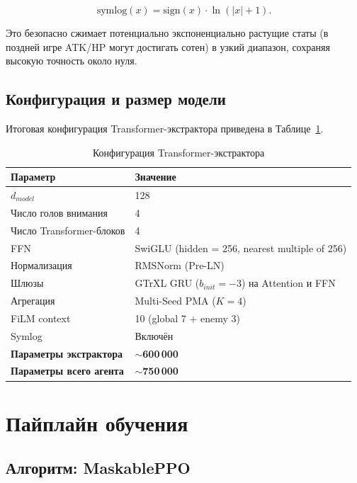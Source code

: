 \documentclass[a4paper,12pt]{extarticle}
\begin{document}
\begin{equation}
\text{symlog}(x) = \text{sign}(x) \cdot \ln(|x| + 1)\text{.}
\end{equation}

Это безопасно сжимает потенциально экспоненциально растущие статы (в поздней игре ATK/HP могут достигать сотен) в узкий диапазон, сохраняя высокую точность около нуля.

\subsection{Конфигурация и размер модели}

Итоговая конфигурация Transformer-экстрактора приведена в Таблице~\ref{tab:transformer_config}.

\begin{longtable}{p{5.5cm}p{8cm}}
\caption{Конфигурация Transformer-экстрактора}\label{tab:transformer_config}\\
\toprule
\textbf{Параметр} & \textbf{Значение} \\
\midrule
$d_{model}$ & 128 \\
Число голов внимания & 4 \\
Число Transformer-блоков & 4 \\
FFN & SwiGLU (hidden = 256, nearest multiple of 256) \\
Нормализация & RMSNorm (Pre-LN) \\
Шлюзы & GTrXL GRU ($b_{init} = -3$) на Attention и FFN \\
Агрегация & Multi-Seed PMA ($K = 4$) \\
FiLM context & 10 (global 7 + enemy 3) \\
Symlog & Включён \\
\midrule
\textbf{Параметры экстрактора} & \textbf{$\sim$600\,000} \\
\textbf{Параметры всего агента} & \textbf{$\sim$750\,000} \\
\bottomrule
\end{longtable}

\newpage

\section{Пайплайн обучения}

\subsection{Алгоритм: MaskablePPO}
\end{document}
